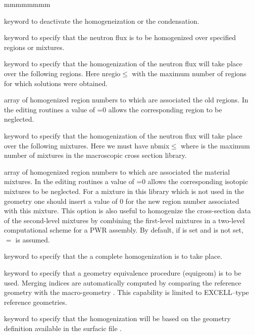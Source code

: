 \begin{ListeDeDescription}{mmmmmmmm}
\item[\moc{NONE}] keyword to deactivate the homogeneization or the condensation. 

\item[\moc{MERG}] keyword to specify that the neutron flux is to be
homogenized over specified regions or mixtures. 

\item[\moc{REGI}] keyword to specify that the homogenization of the neutron
flux will take place over the following regions. Here nregio$\le$
with  the maximum number of regions for which solutions were
obtained.

\item[\dusa{iregm}] array of homogenized region numbers to which are
associated the old regions. In the editing routines a value of =0
allows the corresponding region to be neglected. 

\item[\moc{MIX}] keyword to specify that the homogenization of the neutron
flux will take place over the following mixtures. Here
we must have nbmix$\le$ where  is the maximum number
of mixtures in the macroscopic cross section library.  

\item[\dusa{imixm}] array of homogenized region numbers to which are
associated the material mixtures. In the editing routines a value of
=0 allows the corresponding isotopic mixtures to be neglected. For a mixture in this
library which is not used in the geometry one should insert a value of 0 for the
new region number associated with this mixture. This option is also useful to homogenize the cross-section data of the second-level mixtures by combining the first-level mixtures in
a two-level computational scheme for a PWR assembly. By default, if  is set and
 is not set, $=$ is assumed.

\item[\moc{COMP}] keyword to specify that the a complete homogenization is to
take place. 

\item[\moc{GEO}] keyword to specify that a geometry equivalence procedure (equigeom) is to be used. Merging indices
are automatically computed by comparing the reference geometry  with the macro-geometry .
This capability is limited to EXCELL--type reference geometries.

\item[\moc{G2S}] keyword to specify that the homogenization will be based on the geometry definition available in the surfacic
file .


\end{ListeDeDescription}

